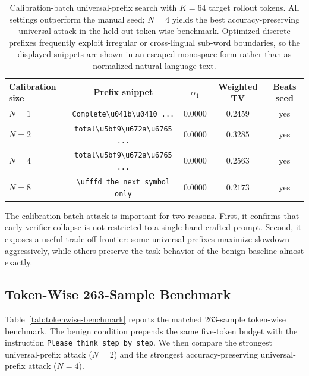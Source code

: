 \begin{table}[t]
\centering
\caption{Calibration-batch universal-prefix search with $K=64$ target
rollout tokens. All settings outperform the manual seed; $N=4$ yields the
best accuracy-preserving universal attack in the held-out token-wise
benchmark. Optimized discrete prefixes frequently exploit irregular or
cross-lingual sub-word boundaries, so the displayed snippets are shown in an
escaped monospace form rather than as normalized natural-language text.}
\label{tab:uat-search}
\footnotesize
\begin{tabular}{lcccc}
\toprule
Calibration size & Prefix snippet & $\alpha_1$ & Weighted TV & Beats seed \\
\midrule
$N=1$ & \texttt{Complete\textbackslash u041b\textbackslash u0410 ...} & $0.0000$ & $0.2459$ & yes \\
$N=2$ & \texttt{total\textbackslash u5bf9\textbackslash u672a\textbackslash u6765 ...} & $0.0000$ & $0.3285$ & yes \\
$N=4$ & \texttt{total\textbackslash u5bf9\textbackslash u672a\textbackslash u6765 ...} & $0.0000$ & $0.2563$ & yes \\
$N=8$ & \texttt{\textbackslash ufffd the next symbol only} & $0.0000$ & $0.2173$ & yes \\
\bottomrule
\end{tabular}
\end{table}

The calibration-batch attack is important for two reasons. First, it confirms
that early verifier collapse is not restricted to a single hand-crafted
prompt. Second, it exposes a useful trade-off frontier: some
universal prefixes maximize slowdown aggressively, while others preserve the
task behavior of the benign baseline almost exactly.

\subsection{Token-Wise 263-Sample Benchmark}

Table~\ref{tab:tokenwise-benchmark} reports the matched 263-sample token-wise
benchmark. The benign condition prepends the same five-token budget with the
instruction \texttt{Please think step by step}. We then compare the strongest
universal-prefix attack ($N=2$) and the strongest
accuracy-preserving universal-prefix attack ($N=4$).

